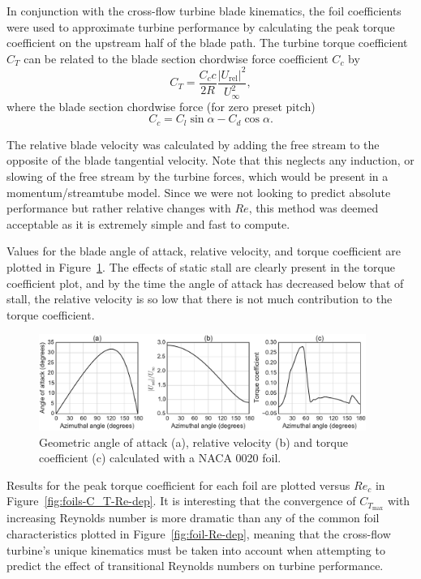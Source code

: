 \documentclass[energies,article,accept,moreauthors,pdftex,12pt,a4paper]{mdpi}
\begin{document}
In conjunction with the cross-flow turbine blade kinematics, the foil
coefficients were used to approximate turbine performance by calculating the
peak torque coefficient on the upstream half of the blade path. The turbine
torque coefficient $C_T$ can be related to the blade section chordwise force
coefficient $C_c$ by
\begin{equation}
C_T = \frac{C_c c}{2R} \frac{|U_\mathrm{rel}|^2}{U_\infty^2},
\end{equation}
where the blade section chordwise force (for zero preset pitch)
\begin{equation}
C_c = C_l \sin \alpha - C_d \cos \alpha.
\end{equation}

The relative blade velocity was calculated by adding the free stream to the
opposite of the blade tangential velocity. Note that this neglects any
induction, or slowing of the free stream by the turbine forces, which would be
present in a momentum/streamtube model. Since we were not looking to predict
absolute performance but rather relative changes with $Re$, this method was
deemed acceptable as it is extremely simple and fast to compute. 

Values for the blade angle of attack, relative velocity, and torque coefficient
are plotted in Figure~\ref{fig:blade-kinematics}. The effects of static stall
are clearly present in the torque coefficient plot, and by the time the angle of
attack has decreased below that of stall, the relative velocity is so low that
there is not much contribution to the torque coefficient.

\begin{figure}[ht!]
\centering
\includegraphics[width=0.95\textwidth]{figures/foil_kinematics_ct}
\caption{Geometric angle of attack (a), relative velocity (b) and torque coefficient
(c) calculated with a NACA 0020 foil.}
\label{fig:blade-kinematics}
\end{figure}

Results for the peak torque coefficient for each foil are plotted versus $Re_c$
in Figure~\ref{fig:foils-C_T-Re-dep}. It is interesting that the convergence of
$C_{T_\mathrm{max}}$ with increasing Reynolds number is more dramatic than any of the
common foil characteristics plotted in Figure~\ref{fig:foil-Re-dep}, meaning
that the cross-flow turbine's unique kinematics must be taken into account when
attempting to predict the effect of transitional Reynolds numbers on turbine
performance. 
\end{document}
